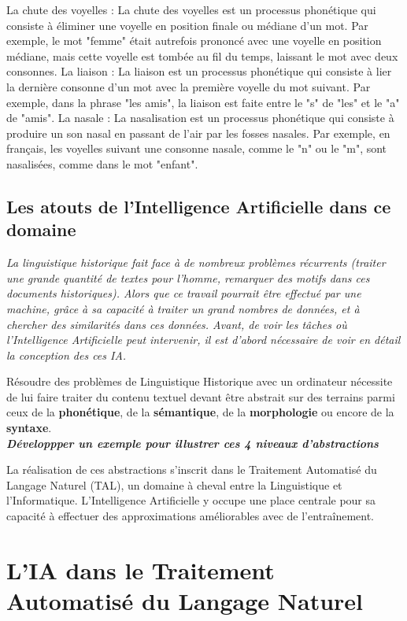 \documentclass[12pt, french, twoside]{report}
\begin{document}
La chute des voyelles : La chute des voyelles est un processus phonétique qui consiste à éliminer une voyelle en position finale ou médiane d'un mot. Par exemple, le mot "femme" était autrefois prononcé avec une voyelle en position médiane, mais cette voyelle est tombée au fil du temps, laissant le mot avec deux consonnes.
La liaison : La liaison est un processus phonétique qui consiste à lier la dernière consonne d'un mot avec la première voyelle du mot suivant. Par exemple, dans la phrase "les amis", la liaison est faite entre le "s" de "les" et le "a" de "amis".
La nasale : La nasalisation est un processus phonétique qui consiste à produire un son nasal en passant de l'air par les fosses nasales. Par exemple, en français, les voyelles suivant une consonne nasale, comme le "n" ou le "m", sont nasalisées, comme dans le mot "enfant".\\ 

\subsection{Les atouts de l'Intelligence Artificielle dans ce domaine}
\textit{La linguistique historique fait face à de nombreux problèmes récurrents (traiter une grande quantité de textes pour l'homme, remarquer des motifs dans ces documents historiques). Alors que ce travail pourrait être effectué par une machine, grâce à sa capacité à traiter un grand nombres de données, et à chercher des similarités dans ces données. Avant, de voir les tâches où l'Intelligence Artificielle peut intervenir, il est d'abord nécessaire de voir en détail la conception des ces IA.}

Résoudre des problèmes de Linguistique Historique avec un ordinateur nécessite de lui faire traiter
du contenu textuel devant être abstrait sur des terrains parmi ceux de la \textbf{phonétique}, de la
\textbf{sémantique}, de la \textbf{morphologie} ou encore de la \textbf{syntaxe}.\\
\textbf{\textit{Développper un exemple pour illustrer ces 4 niveaux d'abstractions}}

La réalisation de ces abstractions s'inscrit dans le Traitement Automatisé du Langage Naturel (TAL),
un domaine à cheval entre la Linguistique et l'Informatique. L'Intelligence Artificielle y occupe
une place centrale pour sa capacité à effectuer des approximations améliorables avec de l'entraînement.
\section{L'IA dans le Traitement Automatisé du Langage Naturel}
\end{document}
